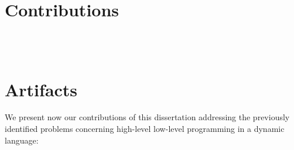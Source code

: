 \section{Contributions}

\\
 \\

\section{Artifacts}

We present now our contributions of this dissertation addressing the previously identified problems concerning high-level low-level programming in a dynamic language:

